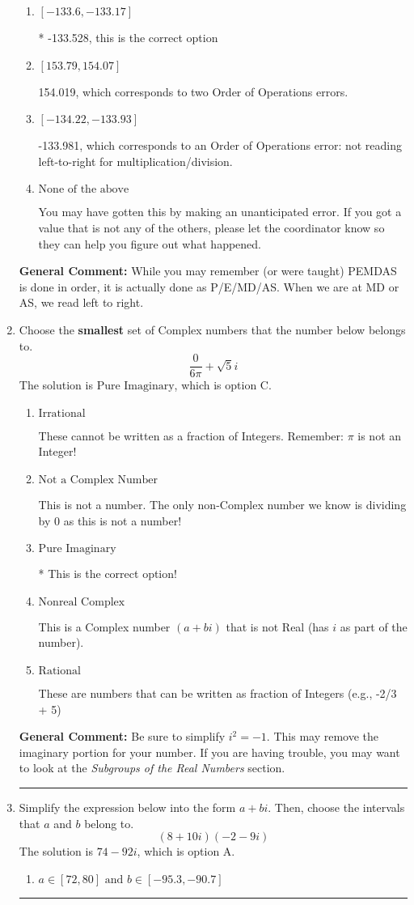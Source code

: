 \documentclass{extbook}[14pt]
\newcommand{\litem}[1]{\item #1

\rule{\textwidth}{0.4pt}}
\begin{document}
\begin{enumerate}
{\begin{enumerate}[label=\Alph*.]
 154.472, which corresponds to an Order of Operations error: multiplying by negative before squaring. For example: $(-3)^2 \neq -3^2$
\item \( [-133.6, -133.17] \)

* -133.528, this is the correct option
\item \( [153.79, 154.07] \)

 154.019, which corresponds to two Order of Operations errors.
\item \( [-134.22, -133.93] \)

 -133.981, which corresponds to an Order of Operations error: not reading left-to-right for multiplication/division.
\item \( \text{None of the above} \)

 You may have gotten this by making an unanticipated error. If you got a value that is not any of the others, please let the coordinator know so they can help you figure out what happened.
\end{enumerate}

\textbf{General Comment:} While you may remember (or were taught) PEMDAS is done in order, it is actually done as P/E/MD/AS. When we are at MD or AS, we read left to right.
}
\litem{
Choose the \textbf{smallest} set of Complex numbers that the number below belongs to.
\[ \frac{0}{6 \pi}+\sqrt{5}i \]The solution is \( \text{Pure Imaginary} \), which is option C.\begin{enumerate}[label=\Alph*.]
\item \( \text{Irrational} \)

These cannot be written as a fraction of Integers. Remember: $\pi$ is not an Integer!
\item \( \text{Not a Complex Number} \)

This is not a number. The only non-Complex number we know is dividing by 0 as this is not a number!
\item \( \text{Pure Imaginary} \)

* This is the correct option!
\item \( \text{Nonreal Complex} \)

This is a Complex number $(a+bi)$ that is not Real (has $i$ as part of the number).
\item \( \text{Rational} \)

These are numbers that can be written as fraction of Integers (e.g., -2/3 + 5)
\end{enumerate}

\textbf{General Comment:} Be sure to simplify $i^2 = -1$. This may remove the imaginary portion for your number. If you are having trouble, you may want to look at the \textit{Subgroups of the Real Numbers} section.
}
\litem{
Simplify the expression below into the form $a+bi$. Then, choose the intervals that $a$ and $b$ belong to.
\[ (8 + 10 i)(-2 - 9 i) \]The solution is \( 74 - 92 i \), which is option A.\begin{enumerate}[label=\Alph*.]
\item \( a \in [72, 80] \text{ and } b \in [-95.3, -90.7] \)


\end{enumerate}}
\end{enumerate}
\end{document}
